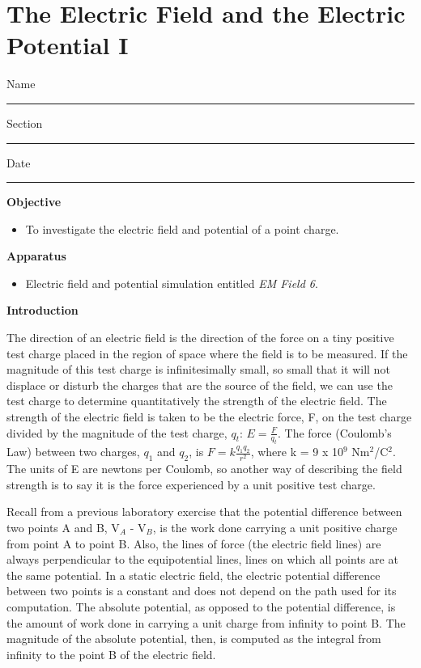 
\section{The Electric Field and the Electric Potential I}

Name \rule{2.0in}{0.1pt}\hfill{}Section \rule{1.0in}{0.1pt}\hfill{}Date
\rule{1.0in}{0.1pt}

\textbf{Objective}

\begin{itemize}
\item To investigate the electric field and potential of a point charge.
\end{itemize}

\textbf{Apparatus}

\begin{itemize}
\item Electric field and potential simulation entitled {\it EM Field 6}.
\end{itemize}

\textbf{Introduction}

The direction of an electric field is the direction of the force on
a tiny positive test charge placed in the region of space where the
field is to be measured. If the magnitude of this test charge is infinitesimally
small, so small that it will not displace or disturb the charges that
are the source of the field, we can use the test charge to determine
quantitatively the strength of the electric field. The strength of
the electric field is taken to be the electric force, F, on the test
charge divided by the magnitude of the test charge, \( q_{t} \):
\( E=\frac{F}{q_{t}} \). The force (Coulomb's Law) between two charges,
\( q_{1} \) and \( q_{2} \), is \( F=k\frac{q_{1}q_{2}}{r^{2}} \),
where k = 9 x 10\( ^{9} \) Nm\( ^{2} \)/C\( ^{2} \). The units
of E are newtons per Coulomb, so another way of describing the field
strength is to say it is the force experienced by a unit positive
test charge.

Recall from a previous laboratory exercise that the potential difference
between two points A and B, V\( _{A} \) - V\( _{B} \), is the work
done carrying a unit positive charge from point A to point B. Also,
the lines of force (the electric field lines) are always perpendicular
to the equipotential lines, lines on which all points are at the same
potential. In a static electric field, the electric potential difference
between two points is a constant and does not depend on the path used
for its computation. The absolute potential, as opposed to the potential
difference, is the amount of work done in carrying a unit charge from
infinity to point B. The magnitude of the absolute potential, then,
is computed as the integral from infinity to the point B of the electric
field.

